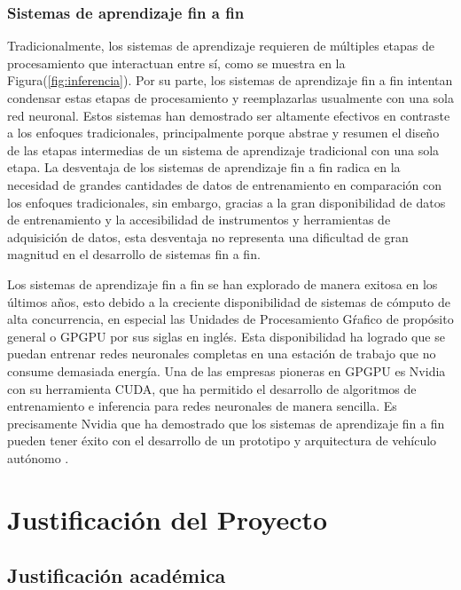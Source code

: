 \documentclass[12pt,letterpaper]{article}
\begin{document}
\subsubsection{Sistemas de aprendizaje fin a fin}
Tradicionalmente, los sistemas de aprendizaje requieren de múltiples etapas de procesamiento que interactuan entre sí, como se 
muestra en la Figura(\ref{fig:inferencia}). Por su parte, los sistemas de aprendizaje fin a fin intentan condensar 
estas etapas de procesamiento y reemplazarlas usualmente con una sola red neuronal. Estos sistemas han demostrado ser 
altamente efectivos en contraste a los enfoques tradicionales, principalmente porque abstrae y resumen el diseño de las 
etapas intermedias de un sistema de aprendizaje tradicional con una sola etapa. La desventaja de los 
sistemas de aprendizaje fin a fin radica en la necesidad de grandes cantidades de datos de entrenamiento 
en comparación con los enfoques tradicionales, sin embargo, gracias a la gran disponibilidad de datos de entrenamiento y 
la accesibilidad de instrumentos y herramientas de adquisición de datos, esta desventaja no representa una dificultad de 
gran magnitud en el desarrollo de sistemas fin a fin. 

Los sistemas de aprendizaje fin a fin se han explorado de manera exitosa en los últimos años, esto debido a la creciente
disponibilidad de sistemas de cómputo de alta concurrencia, en especial las Unidades de Procesamiento Gŕafico de propósito
general o GPGPU por sus siglas en inglés. Esta disponibilidad ha logrado que se puedan entrenar redes neuronales completas 
en una estación de trabajo que no consume demasiada energía. Una de las empresas pioneras en GPGPU es Nvidia con su herramienta 
CUDA, que ha permitido el desarrollo de algoritmos de entrenamiento e inferencia para redes neuronales de manera sencilla. Es 
precisamente Nvidia que ha demostrado que los sistemas de aprendizaje fin a fin pueden tener éxito con el desarrollo de un 
prototipo y arquitectura de vehículo autónomo \cite{bojarski2016end}.



\section{Justificación del Proyecto}

\subsection{Justificación académica}
\end{document}
